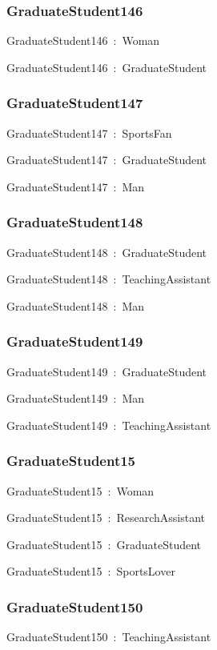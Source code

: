\documentclass{article}
\begin{document}
\subsubsection*{GraduateStudent146}

GraduateStudent146~:~Woman

GraduateStudent146~:~GraduateStudent

\subsubsection*{GraduateStudent147}

GraduateStudent147~:~SportsFan

GraduateStudent147~:~GraduateStudent

GraduateStudent147~:~Man

\subsubsection*{GraduateStudent148}

GraduateStudent148~:~GraduateStudent

GraduateStudent148~:~TeachingAssistant

GraduateStudent148~:~Man

\subsubsection*{GraduateStudent149}

GraduateStudent149~:~GraduateStudent

GraduateStudent149~:~Man

GraduateStudent149~:~TeachingAssistant

\subsubsection*{GraduateStudent15}

GraduateStudent15~:~Woman

GraduateStudent15~:~ResearchAssistant

GraduateStudent15~:~GraduateStudent

GraduateStudent15~:~SportsLover

\subsubsection*{GraduateStudent150}

GraduateStudent150~:~TeachingAssistant
\end{document}
